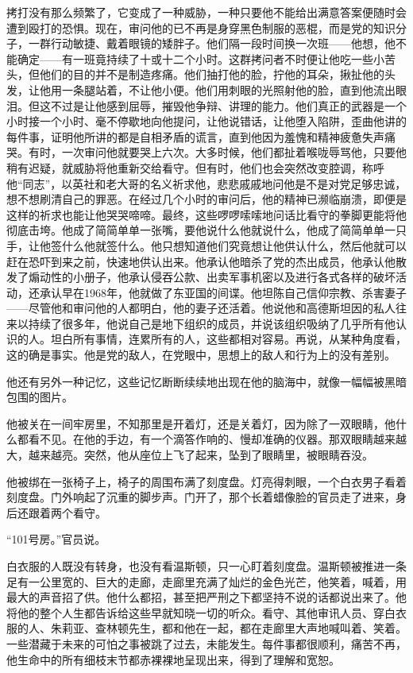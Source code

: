 拷打没有那么频繁了，它变成了一种威胁，一种只要他不能给出满意答案便随时会遭到殴打的恐惧。现在，审问他的已不再是身穿黑色制服的恶棍，而是党的知识分子，一群行动敏捷、戴着眼镜的矮胖子。他们隔一段时间换一次班——他想，他不能确定——有一班竟持续了十或十二个小时。这群拷问者不时便让他吃一些小苦头，但他们的目的并不是制造疼痛。他们抽打他的脸，拧他的耳朵，揪扯他的头发，让他用一条腿站着，不让他小便。他们用刺眼的光照射他的脸，直到他流出眼泪。但这不过是让他感到屈辱，摧毁他争辩、讲理的能力。他们真正的武器是一个小时接一个小时、毫不停歇地向他提问，让他说错话，让他堕入陷阱，歪曲他讲的每件事，证明他所讲的都是自相矛盾的谎言，直到他因为羞愧和精神疲惫失声痛哭。有时，一次审问他就要哭上六次。大多时候，他们都扯着喉咙辱骂他，只要他稍有迟疑，就威胁将他重新交给看守。但有时，他们也会突然改变腔调，称呼他``同志''，以英社和老大哥的名义祈求他，悲悲戚戚地问他是不是对党足够忠诚，想不想刷清自己的罪恶。在经过几个小时的审问后，他的精神已濒临崩溃，即便是这样的祈求也能让他哭哭啼啼。最终，这些啰啰嗦嗦地问话比看守的拳脚更能将他彻底击垮。他成了简简单单一张嘴，要他说什么他就说什么，他成了简简单单一只手，让他签什么他就签什么。他只想知道他们究竟想让他供认什么，然后他就可以赶在恐吓到来之前，快速地供认出来。他承认他暗杀了党的杰出成员，他承认他散发了煽动性的小册子，他承认侵吞公款、出卖军事机密以及进行各式各样的破坏活动，还承认早在1968年，他就做了东亚国的间谍。他坦陈自己信仰宗教、杀害妻子——尽管他和审问他的人都明白，他的妻子还活着。他说他和高德斯坦因的私人往来以持续了很多年，他说自己是地下组织的成员，并说该组织吸纳了几乎所有他认识的人。坦白所有事情，连累所有的人，这些都相对容易。再说，从某种角度看，这的确是事实。他是党的敌人，在党眼中，思想上的敌人和行为上的没有差别。

他还有另外一种记忆，这些记忆断断续续地出现在他的脑海中，就像一幅幅被黑暗包围的图片。

他被关在一间牢房里，不知那里是开着灯，还是关着灯，因为除了一双眼睛，他什么都看不见。在他的手边，有一个滴答作响的、慢却准确的仪器。那双眼睛越来越大，越来越亮。突然，他从座位上飞了起来，坠到了眼睛里，被眼睛吞没。

他被绑在一张椅子上，椅子的周围布满了刻度盘。灯亮得刺眼，一个白衣男子看着刻度盘。门外响起了沉重的脚步声。门开了，那个长着蜡像脸的官员走了进来，身后还跟着两个看守。

``101号房。''官员说。

白衣服的人既没有转身，也没有看温斯顿，只一心盯着刻度盘。温斯顿被推进一条足有一公里宽的、巨大的走廊，走廊里充满了灿烂的金色光芒，他笑着，喊着，用最大的声音招了供。他什么都招，甚至把严刑之下都坚持不说的话都说出来了。他将他的整个人生都告诉给这些早就知晓一切的听众。看守、其他审讯人员、穿白衣服的人、朱莉亚、查林顿先生，都和他在一起，都在走廊里大声地喊叫着、笑着。一些潜藏于未来的可怕之事被跳了过去，未能发生。每件事都很顺利，痛苦不再，他生命中的所有细枝末节都赤裸裸地呈现出来，得到了理解和宽恕。

